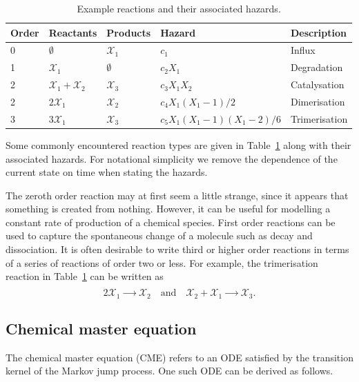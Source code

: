 \documentclass[12pt, DIV12]{scrartcl}
\begin{document}
\begin{table}[t]
\centering
\begin{tabular}{@{}l lll l@{}}
\toprule
Order  & Reactants & Products & Hazard & Description  \\ 
\midrule
0 & $\emptyset$ &  $\mathcal{X}_{1}$ & $c_{1}$ &  Influx\\
1 & $\mathcal{X}_{1}$ &  $\emptyset$   & $c_{2}X_{1}$ & Degradation\\
2 & $\mathcal{X}_{1}+\mathcal{X}_{2}$ & $\mathcal{X}_{3}$   & $c_{3}X_{1}X_{2}$ & Catalysation\\
2 & $2\mathcal{X}_{1}$ & $\mathcal{X}_{2}$  & $c_{4} X_{1}(X_{1}-1)/2$ & Dimerisation\\
3 & $3\mathcal{X}_{1}$ & $\mathcal{X}_{3}$  & $c_{5} X_{1}(X_{1}-1)(X_{1}-2)/6$ & Trimerisation \\
\bottomrule
\end{tabular}
\caption{Example reactions and their associated hazards.}\label{tab:tab1}
\end{table} 
Some commonly encountered reaction types are given in Table~\ref{tab:tab1} along
with their associated hazards. For notational simplicity we remove the
dependence of the current state on time when stating the hazards.

The zeroth order reaction may at first seem a little strange, since it appears
that something is created from nothing. However, it can be useful for modelling
a constant rate of production of a chemical species. First order reactions can
be used to capture the spontaneous change of a molecule such as decay and
dissociation. It is often desirable to write third or higher order reactions in
terms of a series of reactions of order two or less. For example, the
trimerisation reaction in Table~\ref{tab:tab1} can be written as
\[
2\mathcal{X}_{1} \xrightarrow{\phantom{a}\phantom{c_{6}}\phantom{a}}
\mathcal{X}_{2} 
\quad \text{and}\quad
\mathcal{X}_{2} + \mathcal{X}_{1}
\xrightarrow{\phantom{a}\phantom{c_{7}}\phantom{a}} \mathcal{X}_{3}.
\]  

\subsection{Chemical master equation}

The chemical master equation (CME) refers to an ODE satisfied by the transition
kernel of the Markov jump process. One such ODE can be derived as follows.
\end{document}
